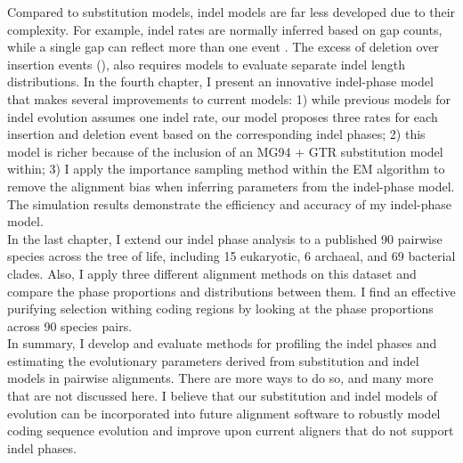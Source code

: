 \indent Compared to substitution models, indel models are far less developed due to their complexity. For example, indel rates are normally inferred based on gap counts, while a single gap can reflect more than one event \parencite{miklos2004long}. The excess of deletion over insertion events (\cite{ophir1997patterns, zhang2003patterns, gu1995size}), also requires models to evaluate separate indel length distributions. In the fourth chapter, I present an innovative indel-phase model that makes several improvements to current models: 1) while previous models for indel evolution assumes one indel rate, our model proposes three rates for each insertion and deletion event based on the corresponding indel phases; 2) this model is richer because of the inclusion of an MG94 + GTR substitution model within; 3) I apply the importance sampling method within the EM algorithm to remove the alignment bias when inferring parameters from the indel-phase model. The simulation results demonstrate the efficiency and accuracy of my indel-phase model. \\
\indent In the last chapter, I extend our indel phase analysis to a published 90 pairwise species across the tree of life, including 15 eukaryotic, 6 archaeal, and 69 bacterial clades. Also, I apply three different alignment methods on this dataset and compare the phase proportions and distributions between them. I find an effective purifying selection withing coding regions by looking at the phase proportions across 90 species pairs.  \\
\indent In summary, I develop and evaluate methods for profiling the indel phases and estimating the evolutionary parameters derived from substitution and indel models in pairwise alignments. There are more ways to do so, and many more that are not discussed here. I believe that our substitution and indel models of evolution can be incorporated into future alignment software to robustly model coding sequence evolution and improve upon current aligners that do not support indel phases. 

